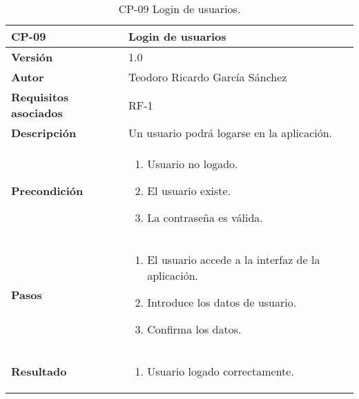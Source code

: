 \begin{table}[p]
	\centering
	\begin{tabularx}{\linewidth}{ p{} p{} }
		\toprule
		\textbf{CP-09}    & \textbf{Login de usuarios}\\
		\toprule
		\textbf{Versión}              & 1.0    \\
		\textbf{Autor}                & Teodoro Ricardo García Sánchez \\
		\textbf{Requisitos asociados} & RF-1 \\
		\textbf{Descripción}          & Un usuario podrá logarse en la aplicación. \\
		\textbf{Precondición}         & 
		\begin{enumerate}
			\def\labelenumi{\arabic{enumi}.}
			\tightlist
			\item Usuario no logado.
			\item El usuario existe.
			\item La contraseña es válida.
		\end{enumerate}\\
		\textbf{Pasos}             &
		\begin{enumerate}
			\def\labelenumi{\arabic{enumi}.}
			\tightlist
			\item El usuario accede a la interfaz de la aplicación.
			\item Introduce los datos de usuario.
			\item Confirma los datos.
		\end{enumerate}\\
		\textbf{Resultado}          & 
		\begin{enumerate}
			\item Usuario logado correctamente.
		\end{enumerate}\\
		\bottomrule
	\end{tabularx}
	\caption{CP-09 Login de usuarios.}
\end{table}

